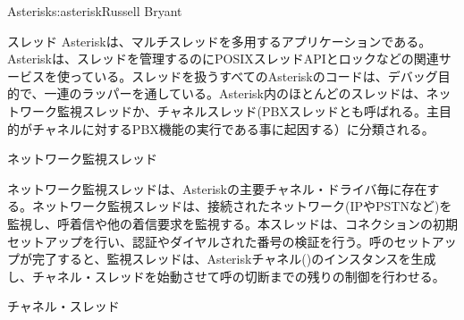 \begin{aosachapter}{Asterisk}{s:asterisk}{Russell Bryant}
\begin{aosasect1}{スレッド}
Asteriskは、マルチスレッドを多用するアプリケーションである。Asteriskは、スレッドを管理するのにPOSIXスレッドAPIとロックなどの関連サービスを使っている。スレッドを扱うすべてのAsteriskのコードは、デバッグ目的で、一連のラッパーを通している。Asterisk内のほとんどのスレッドは、ネットワーク監視スレッドか、チャネルスレッド(PBXスレッドとも呼ばれる。主目的がチャネルに対するPBX機能の実行である事に起因する）に分類される。

\begin{aosasect2}{ネットワーク監視スレッド}

ネットワーク監視スレッドは、Asteriskの主要チャネル・ドライバ毎に存在する。ネットワーク監視スレッドは、接続されたネットワーク(IPやPSTNなど)を監視し、呼着信や他の着信要求を監視する。本スレッドは、コネクションの初期セットアップを行い、認証やダイヤルされた番号の検証を行う。呼のセットアップが完了すると、監視スレッドは、Asteriskチャネル()のインスタンスを生成し、チャネル・スレッドを始動させて呼の切断までの残りの制御を行わせる。

\end{aosasect2}

\begin{aosasect2}{チャネル・スレッド}


\end{aosasect2}
\end{aosasect1}
\end{aosachapter}
